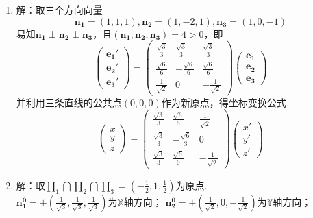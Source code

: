 \documentclass[UTF8]{ctexart}
\begin{document}
\begin{enumerate}
\item 解：取三个方向向量
$$\mathbf{n_1}=\left(1,1,1\right),\mathbf{n_2}=\left(1,-2,1\right),\mathbf{n_3}=\left(1,0,-1\right)$$
易知$\mathbf{n_1}\perp\mathbf{n_2}\perp\mathbf{n_3}$，且$\left(\mathbf{n_1},\mathbf{n_2},\mathbf{n_3}\right)=4>0$，即
$$\left(\begin{array}{c}\mathbf{e_1}'\\\mathbf{e_2}'\\\mathbf{e_3}'\end{array}\right)=\left(\begin{array}{ccc}\displaystyle\frac{\sqrt{3}}{3}&\displaystyle\frac{\sqrt{3}}{3}&\displaystyle\frac{\sqrt{3}}{3}\\\displaystyle\frac{\sqrt{6}}{6}&\displaystyle-\frac{\sqrt{6}}{6}&\displaystyle\frac{\sqrt{6}}{6}\\\displaystyle\frac{1}{\sqrt{2}}&0&\displaystyle-\frac{1}{\sqrt{2}}\end{array}\right)\left(\begin{array}{c}\mathbf{e_1}\\\mathbf{e_2}\\\mathbf{e_3}\end{array}\right)$$
并利用三条直线的公共点$(0,0,0)$作为新原点，得坐标变换公式
$$\left(\begin{array}{c}x\\y\\z\end{array}\right)=\left(\begin{array}{ccc}\displaystyle\frac{\sqrt{3}}{3}&\displaystyle\frac{\sqrt{6}}{6}&\displaystyle\frac{1}{\sqrt{2}}\\\displaystyle\frac{\sqrt{3}}{3}&\displaystyle-\frac{\sqrt{6}}{3}&0\\\displaystyle\frac{\sqrt{3}}{3}&\displaystyle\frac{\sqrt{6}}{6}&\displaystyle-\frac{1}{\sqrt{2}}\end{array}\right)\left(\begin{array}{c}x'\\y'\\z'\end{array}\right)$$
\item 解：取$\prod_1\bigcap\prod_2\bigcap\prod_3=\left(\displaystyle-\frac{1}{2},1,\displaystyle\frac{1}{2}\right)$为原点.\\
$\mathbf{n_1^0}=\pm\left(\displaystyle\frac{1}{\sqrt{3}},\displaystyle\frac{1}{\sqrt{3}},\displaystyle\frac{1}{\sqrt{3}}\right)$为$\mathbb{X}$轴方向；
$\mathbf{n_2^0}=\pm\left(\displaystyle\frac{1}{\sqrt{2}},0,\displaystyle-\frac{1}{\sqrt{2}}\right)$为$\mathbb{Y}$轴方向；

\end{enumerate}
\end{document}
